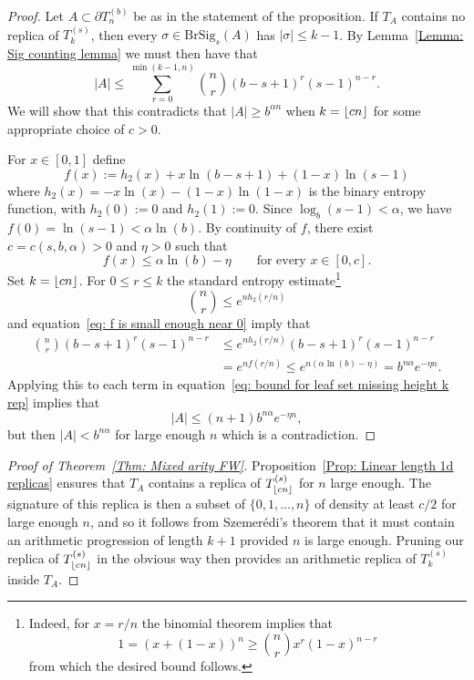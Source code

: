 \documentclass[11pt]{amsart}
\DeclarePairedDelimiter\floor{\lfloor}{\rfloor}
\newcommand\labs[1]{\left\lvert#1\right\rvert}
\renewcommand{\leq}{\leqslant}
\renewcommand{\geq}{\geqslant}
\theoremstyle{plain}
\theoremstyle{definition}
\theoremstyle{remark}
\begin{document}
\begin{proof}
Let $A\subset \partial T_n^{(b)}$ be as in the statement of the proposition. If $T_A$ contains no replica of $T_k^{(s)}$, then every $\sigma \in \mathrm{BrSig}_s(A)$ has $\labs{\sigma}\leq k-1$. By Lemma~\ref{Lemma: Sig counting lemma} we must then have that
\begin{equation}\label{eq: bound for leaf set missing height k rep}
 \labs{A} \leq \sum_{r=0}^{\min(k-1,n)}\binom{n}{r} (b-s+1)^r (s-1)^{n-r}.
\end{equation}
We will show that this contradicts that $\labs{A}\geq b^{\alpha n}$ when $k = \floor{cn}$ for some appropriate choice of $c>0$.

For $x\in [0,1]$ define
\[ f(x) := h_2(x) + x \ln (b-s+1) + (1-x) \ln (s-1)\]
where $h_2(x) =-x \ln( x) - (1-x) \ln (1-x)$ is the binary entropy function, with $h_2(0):=0$ and $h_2(1):=0$. Since $\log_b(s-1)<\alpha$, we have $f(0) = \ln(s-1) < \alpha \ln (b)$. By continuity of $f$, there exist $c=c(s,b,\alpha)>0$ and $\eta>0$ such that
\begin{equation}\label{eq: f is small enough near 0}
f(x) \leq \alpha \ln(b) -\eta \qquad \text{for every } x\in [0,c].
\end{equation}
Set $k=\floor{cn}$. For $0\leq r \leq k$ the standard entropy estimate\footnote{Indeed, for $x=r/n$ the binomial theorem implies that
\[ 1= (x+(1-x))^n \geq \binom{n}{r}x^r(1-x)^{n-r}\] from which the desired bound follows.}
\[ \binom{n}{r} \leq e^{n h_2\left( r/n\right)}\]
and equation~\eqref{eq: f is small enough near 0} imply that
\begin{align*}
\binom{n}{r} (b-s+1)^r (s-1)^{n-r} &\leq e^{n h_2\left( r/n\right)}(b-s+1)^r (s-1)^{n-r}\\
&=e^{n f\left(r/n\right)} \leq e^{n(\alpha \ln(b) - \eta)} = b^{n\alpha} e^{-\eta n}.
\end{align*}
Applying this to each term in equation~\eqref{eq: bound for leaf set missing height k rep} implies that
\[ \labs{A} \leq (n+1) b^{n \alpha} e^{-\eta n},\]
but then $\labs{A} < b^{n\alpha}$ for large enough $n$ which is a contradiction.
\end{proof}
\begin{proof}[Proof of Theorem~\ref{Thm: Mixed arity FW}]
Proposition~\ref{Prop: Linear length 1d replicas} ensures that $T_A$ contains a replica of $T_{\floor{cn}}^{(s)}$ for $n$ large enough. The signature of this replica is then a subset of $\{0,1,\ldots,n\}$ of density at least $c/2$ for large enough $n$, and so it follows from Szemer\'{e}di's theorem that it must contain an arithmetic progression of length $k+1$ provided $n$ is large enough. Pruning our replica of $T_{\floor{cn}}^{(s)}$ in the obvious way then provides an arithmetic replica of $T_k^{(s)}$ inside $T_A$.
\end{proof}
\end{document}

